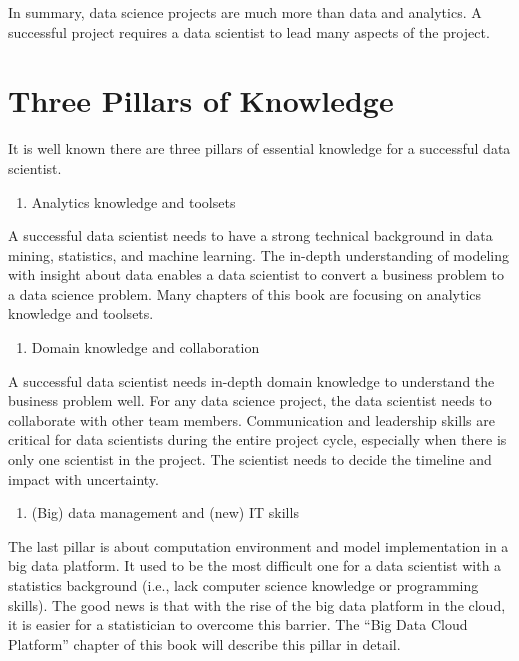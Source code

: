 \documentclass[
  12pt,
]{krantz}
\providecommand{\tightlist}{%
  \setlength{\itemsep}{0pt}\setlength{\parskip}{0pt}}
\begin{document}
In summary, data science projects are much more than data and analytics. A successful project requires a data scientist to lead many aspects of the project.

\hypertarget{three-pillars-of-knowledge}{%
\section{Three Pillars of Knowledge}\label{three-pillars-of-knowledge}}

It is well known there are three pillars of essential knowledge for a successful data scientist.

\begin{enumerate}
\def\labelenumi{(\arabic{enumi})}
\tightlist
\item
  Analytics knowledge and toolsets
\end{enumerate}

A successful data scientist needs to have a strong technical background in data mining, statistics, and machine learning. The in-depth understanding of modeling with insight about data enables a data scientist to convert a business problem to a data science problem. Many chapters of this book are focusing on analytics knowledge and toolsets.

\begin{enumerate}
\def\labelenumi{(\arabic{enumi})}
\setcounter{enumi}{1}
\tightlist
\item
  Domain knowledge and collaboration
\end{enumerate}

A successful data scientist needs in-depth domain knowledge to understand the business problem well. For any data science project, the data scientist needs to collaborate with other team members. Communication and leadership skills are critical for data scientists during the entire project cycle, especially when there is only one scientist in the project. The scientist needs to decide the timeline and impact with uncertainty.

\begin{enumerate}
\def\labelenumi{(\arabic{enumi})}
\setcounter{enumi}{2}
\tightlist
\item
  (Big) data management and (new) IT skills
\end{enumerate}

The last pillar is about computation environment and model implementation in a big data platform. It used to be the most difficult one for a data scientist with a statistics background (i.e., lack computer science knowledge or programming skills). The good news is that with the rise of the big data platform in the cloud, it is easier for a statistician to overcome this barrier. The ``Big Data Cloud Platform'' chapter of this book will describe this pillar in detail.
\end{document}
